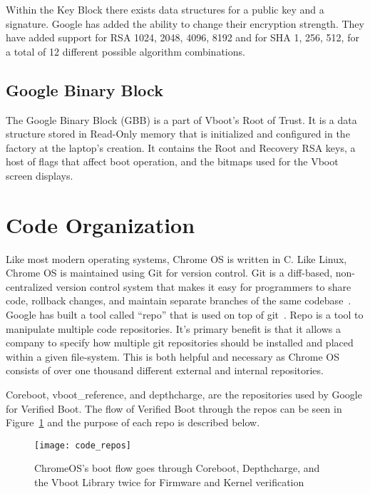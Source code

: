 Within the Key Block there exists data structures for a public key and a signature.
Google has added the ability to change their encryption strength.
They have added support for RSA 1024, 2048, 4096, 8192 and for SHA 1, 256, 512, for a total of 12 different possible algorithm combinations.

\subsection{Google Binary Block}

The Google Binary Block (GBB) is a part of Vboot's Root of Trust.
It is a data structure stored in Read-Only memory that is initialized and configured in the factory at the laptop's creation.
It contains the Root and Recovery RSA keys, a host of flags that affect boot
operation, and the bitmaps used for the Vboot screen displays.


\section{Code Organization}

Like most modern operating systems, Chrome OS is written in C.
Like Linux, Chrome OS is maintained using Git for version control. 
Git is a diff-based, non-centralized version control system that makes it easy for programmers to share code, rollback changes, and maintain separate branches of the same codebase~\cite{git}.
Google has built a tool called ``repo'' that is used on top of git~\cite{repo}. 
Repo is a tool to manipulate multiple code repositories. 
It's primary benefit is that it allows a company to specify how multiple git repositories should be installed and placed within a given file-system.
This is both helpful and necessary as Chrome OS consists of over one thousand different external and internal repositories. 

Coreboot, vboot\_reference, and depthcharge, are the repositories used by Google
for Verified Boot.
The flow of Verified Boot through the repos can be seen in
Figure~\ref{fig:code_repos} and the purpose of each repo is described below.

\begin{figure}
  \centering
  \texttt{[image: code\_repos]}
  \caption[Vboot Repository layout]{ChromeOS's boot flow goes through Coreboot, Depthcharge, and the Vboot Library twice for Firmware and Kernel verification}\label{fig:code_repos}
\end{figure}

